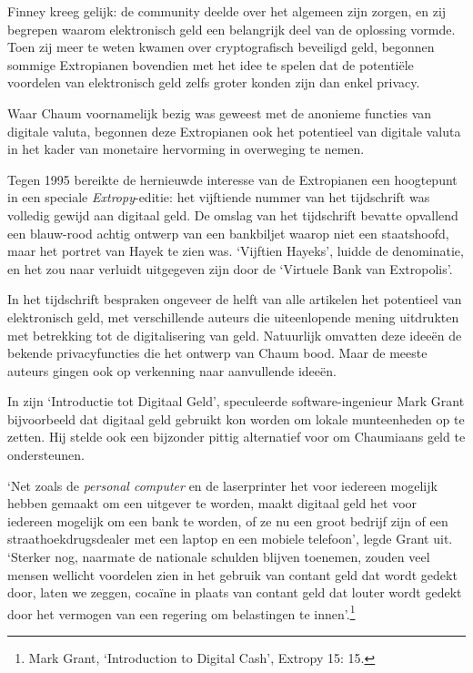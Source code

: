 \documentclass[smalldemyvopaper,11pt,twoside,onecolumn,openright,extrafontsizes,hidelinks]{memoir}
\begin{document}
Finney kreeg gelijk: de community deelde over het algemeen zijn zorgen,
en zij begrepen waarom elektronisch geld een belangrijk deel van de
oplossing vormde. Toen zij meer te weten kwamen over cryptografisch
beveiligd geld, begonnen sommige Extropianen bovendien met het idee te
spelen dat de potentiële voordelen van elektronisch geld zelfs groter
konden zijn dan enkel privacy.

Waar Chaum voornamelijk bezig was geweest met de anonieme functies van
digitale valuta, begonnen deze Extropianen ook het potentieel van
digitale valuta in het kader van monetaire hervorming in overweging te
nemen.

Tegen 1995 bereikte de hernieuwde interesse van de Extropianen een
hoogtepunt in een speciale \emph{Extropy}-editie: het vijftiende nummer
van het tijdschrift was volledig gewijd aan digitaal geld. De omslag van
het tijdschrift bevatte opvallend een blauw-rood achtig ontwerp van een
bankbiljet waarop niet een staatshoofd, maar het portret van Hayek te
zien was. `Vijftien Hayeks', luidde de denominatie, en het zou naar
verluidt uitgegeven zijn door de `Virtuele Bank van Extropolis'.

In het tijdschrift bespraken ongeveer de helft van alle artikelen het
potentieel van elektronisch geld, met verschillende auteurs die
uiteenlopende mening uitdrukten met betrekking tot de digitalisering van
geld. Natuurlijk omvatten deze ideeën de bekende privacyfuncties die het
ontwerp van Chaum bood. Maar de meeste auteurs gingen ook op verkenning
naar aanvullende ideeën.

In zijn `Introductie tot Digitaal Geld', speculeerde software-ingenieur
Mark Grant bijvoorbeeld dat digitaal geld gebruikt kon worden om lokale
munteenheden op te zetten. Hij stelde ook een bijzonder pittig
alternatief voor om Chaumiaans geld te ondersteunen.

`Net zoals de \emph{personal computer} en de laserprinter het voor
iedereen mogelijk hebben gemaakt om een uitgever te worden, maakt
digitaal geld het voor iedereen mogelijk om een bank te worden, of ze nu
een groot bedrijf zijn of een straathoekdrugsdealer met een laptop en
een mobiele telefoon', legde Grant uit. `Sterker nog, naarmate de
nationale schulden blijven toenemen, zouden veel mensen wellicht
voordelen zien in het gebruik van contant geld dat wordt gedekt door,
laten we zeggen, cocaïne in plaats van contant geld dat louter wordt
gedekt door het vermogen van een regering om belastingen te
innen'.\footnote{Mark Grant, `Introduction to Digital Cash', Extropy 15:
  15.}
\end{document}
